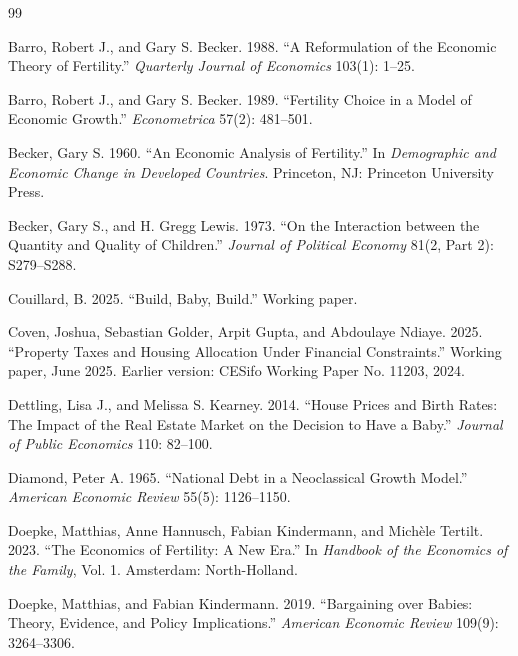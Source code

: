 \documentclass[11pt]{article}
\newcommand{\1}{\mathbf 1}
\begin{document}
\begin{thebibliography}{99}
\small

Barro, Robert J., and Gary S. Becker. 1988. ``A Reformulation of the Economic Theory of Fertility.'' \emph{Quarterly Journal of Economics} 103(1): 1--25.

Barro, Robert J., and Gary S. Becker. 1989. ``Fertility Choice in a Model of Economic Growth.'' \emph{Econometrica} 57(2): 481--501.

Becker, Gary S. 1960. ``An Economic Analysis of Fertility.'' In \emph{Demographic and Economic Change in Developed Countries}. Princeton, NJ: Princeton University Press.

Becker, Gary S., and H. Gregg Lewis. 1973. ``On the Interaction between the Quantity and Quality of Children.'' \emph{Journal of Political Economy} 81(2, Part 2): S279--S288.

Couillard, B. 2025. ``Build, Baby, Build.'' Working paper.

Coven, Joshua, Sebastian Golder, Arpit Gupta, and Abdoulaye Ndiaye. 2025. ``Property Taxes and Housing Allocation Under Financial Constraints.'' Working paper, June 2025. Earlier version: CESifo Working Paper No. 11203, 2024.

Dettling, Lisa J., and Melissa S. Kearney. 2014. ``House Prices and Birth Rates: The Impact of the Real Estate Market on the Decision to Have a Baby.'' \emph{Journal of Public Economics} 110: 82--100.

Diamond, Peter A. 1965. ``National Debt in a Neoclassical Growth Model.'' \emph{American Economic Review} 55(5): 1126--1150.

Doepke, Matthias, Anne Hannusch, Fabian Kindermann, and Mich\`ele Tertilt. 2023. ``The Economics of Fertility: A New Era.'' In \emph{Handbook of the Economics of the Family}, Vol. 1. Amsterdam: North-Holland.

Doepke, Matthias, and Fabian Kindermann. 2019. ``Bargaining over Babies: Theory, Evidence, and Policy Implications.'' \emph{American Economic Review} 109(9): 3264--3306.


\end{thebibliography}
\end{document}
